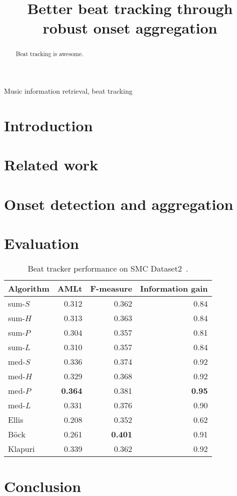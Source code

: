 \documentclass{article}
\title{Better beat tracking through robust onset aggregation}
\begin{document}
%
\maketitle
%
\begin{abstract}
Beat tracking is awesome.
\end{abstract}
%
\begin{keywords}
Music information retrieval, beat tracking
\end{keywords}
%
\section{Introduction}
\label{sec:intro}

\section{Related work}
\label{sec:related}
\cite{holzapfel2012}

\section{Onset detection and aggregation}
\label{sec:onsets}

\section{Evaluation}
\label{sec:eval}


\begin{table}
\centering
\label{tab:results:smc2}
\caption{Beat tracker performance on SMC Dataset2~\cite{holzapfel2012}.}
\begin{tabular}{lrrr}
\toprule%
Algorithm   & AMLt  & F-measure & Information gain\\
\hline
sum-$S$     & 0.312 & 0.362     & 0.84             \\
sum-$H$     & 0.313 & 0.363     & 0.84             \\
sum-$P$     & 0.304 & 0.357     & 0.81             \\
sum-$L$     & 0.310 & 0.357     & 0.84             \\
\hline
med-$S$     & 0.336 & 0.374     & 0.92             \\
med-$H$     & 0.329 & 0.368     & 0.92             \\
med-$P$     & \textbf{0.364} & 0.381     & \textbf{0.95}    \\
med-$L$     & 0.331 & 0.376     & 0.90             \\
\hline
Ellis~\cite{ellis2007beat} & 0.208 & 0.352 & 0.62\\
B\"{o}ck~\cite{bock2011enhanced} & 0.261 & \textbf{0.401} & 0.91\\
Klapuri~\cite{klapuri2006analysis} & 0.339 & 0.362 & 0.92\\
\bottomrule%
\end{tabular}

\end{table}

\section{Conclusion}
\label{sec:conclusion}



\end{document}
